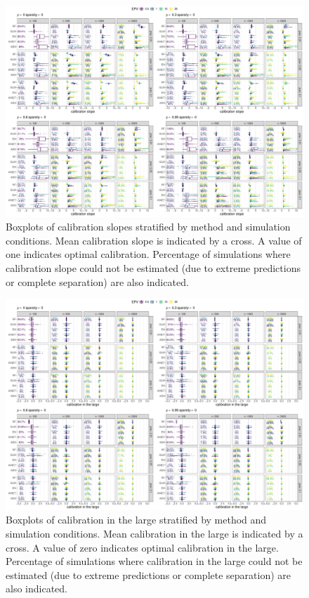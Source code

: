 \begin{subappendices}
\begin{landscape}
\begin{figure}[!ht]
\center
\includegraphics[width=0.9\linewidth]{images/paper6/calibration-cslope_sparsity0.pdf}
\caption{Boxplots of calibration slopes stratified by method and simulation
  conditions. Mean calibration slope is indicated by a cross. A value of one
  indicates optimal calibration. Percentage of simulations where calibration
  slope could not be estimated (due to extreme predictions or complete
  separation) are also indicated.} \label{fig6:cslope}
\end{figure}
\end{landscape}

\begin{landscape}
\begin{figure}[!ht]
\center
\includegraphics[width=0.9\linewidth]{images/paper6/calibration-clarge_sparsity0.pdf}
\caption{Boxplots of calibration in the large stratified by method and
  simulation conditions. Mean calibration in the large is indicated by a cross.
  A value of zero indicates optimal calibration in the large. Percentage of
  simulations where calibration in the large could not be estimated (due to
  extreme predictions or complete separation) are also
  indicated.} \label{fig6:clarge}
\end{figure}
\end{landscape}

\end{subappendices}

\newpage


